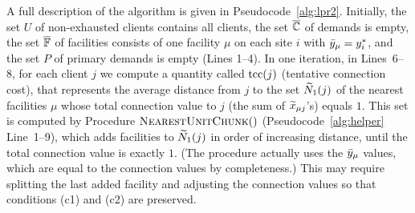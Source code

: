 \documentclass[11pt]{article}
\begin{document}
A full description of the algorithm is given in
Pseudocode~\ref{alg:lpr2}.  Initially, the set $U$ of
non-exhausted clients contains all clients, the set
$\overline{\mathbb{C}}$ of demands is empty, the set $\overline{\mathbb{F}}$ of
facilities consists of one facility $\mu$ on each site $i$
with ${\bar y}_\mu = y^\ast_i$, and the set $P$ of primary
demands is empty (Lines 1--4).  In one iteration, in
Lines~6--8, for each client $j$ we compute a quantity called
$\textrm{tcc}(j)$ (tentative connection cost), that represents the
average distance from $j$ to the set ${\widetilde N}_1(j)$ of the
nearest facilities $\mu$ whose total connection value to $j$
(the sum of ${\widetilde x}_{\mu j}$'s) equals $1$.  This set is
computed by Procedure ${\textsc{NearestUnitChunk}}()$
(Pseudocode~\ref{alg:helper} Line~1--9), which adds
facilities to ${\widetilde N}_1(j)$ in order of increasing
distance, until the total connection value is exactly
$1$. (The procedure actually uses the ${\bar y}_\mu$ values,
which are equal to the connection values by completeness.)
This may require splitting the last added facility and
adjusting the connection values so that conditions (c1) and
(c2) are preserved.

\end{document}
